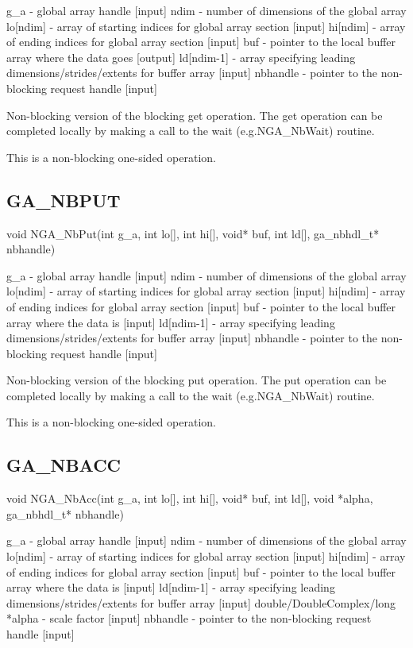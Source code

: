 g\_a - global array handle {[}input{]} ndim - number of dimensions
of the global array lo{[}ndim{]} - array of starting indices for global
array section {[}input{]} hi{[}ndim{]} - array of ending indices for
global array section {[}input{]} buf - pointer to the local buffer
array where the data goes {[}output{]} ld{[}ndim-1{]} - array specifying
leading dimensions/strides/extents for buffer array {[}input{]} nbhandle
- pointer to the non-blocking request handle {[}input{]}

Non-blocking version of the blocking get operation. The get operation
can be completed locally by making a call to the wait (e.g.NGA\_NbWait)
routine.

This is a non-blocking one-sided operation. 


\subsection*{GA\_NBPUT}

void NGA\_NbPut(int g\_a, int lo{[}{]}, int hi{[}{]}, void{*} buf,
int ld{[}{]}, ga\_nbhdl\_t{*} nbhandle)

g\_a - global array handle {[}input{]} ndim - number of dimensions
of the global array lo{[}ndim{]} - array of starting indices for global
array section {[}input{]} hi{[}ndim{]} - array of ending indices for
global array section {[}input{]} buf - pointer to the local buffer
array where the data is {[}input{]} ld{[}ndim-1{]} - array specifying
leading dimensions/strides/extents for buffer array {[}input{]} nbhandle
- pointer to the non-blocking request handle {[}input{]}

Non-blocking version of the blocking put operation. The put operation
can be completed locally by making a call to the wait (e.g.NGA\_NbWait)
routine.

This is a non-blocking one-sided operation.


\subsection*{GA\_NBACC}

void NGA\_NbAcc(int g\_a, int lo{[}{]}, int hi{[}{]}, void{*} buf,
int ld{[}{]}, void {*}alpha, ga\_nbhdl\_t{*} nbhandle)

g\_a - global array handle {[}input{]} ndim - number of dimensions
of the global array lo{[}ndim{]} - array of starting indices for global
array section {[}input{]} hi{[}ndim{]} - array of ending indices for
global array section {[}input{]} buf - pointer to the local buffer
array where the data is {[}input{]} ld{[}ndim-1{]} - array specifying
leading dimensions/strides/extents for buffer array {[}input{]} double/DoubleComplex/long
{*}alpha - scale factor {[}input{]} nbhandle - pointer to the non-blocking
request handle {[}input{]}

